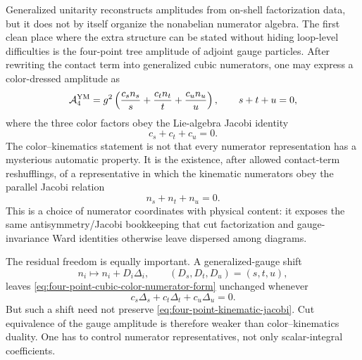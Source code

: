 \begin{construction}
\label{constr:four-point-color-kinematics-comparison}
Generalized unitarity reconstructs amplitudes from on-shell factorization
data, but it does not by itself organize the nonabelian numerator algebra.
The first clean place where the extra structure can be stated without hiding
loop-level difficulties is the four-point tree amplitude of adjoint gauge
particles.  After rewriting the contact term into generalized cubic
numerators, one may express a color-dressed amplitude as
\begin{equation}
  \mathcal A_4^{\rm YM}
  =
  g^2\left(
    \frac{c_s n_s}{s}
    +\frac{c_t n_t}{t}
    +\frac{c_u n_u}{u}
  \right),
  \qquad s+t+u=0,
  \label{eq:four-point-cubic-color-numerator-form}
\end{equation}
where the three color factors obey the Lie-algebra Jacobi identity
\begin{equation}
  c_s+c_t+c_u=0 .
  \label{eq:four-point-color-jacobi}
\end{equation}
The color--kinematics statement is not that every numerator representation
has a mysterious automatic property.  It is the existence, after allowed
contact-term reshufflings, of a representative in which the kinematic
numerators obey the parallel Jacobi relation
\begin{equation}
  n_s+n_t+n_u=0 .
  \label{eq:four-point-kinematic-jacobi}
\end{equation}
This is a choice of numerator coordinates with physical content: it exposes
the same antisymmetry/Jacobi bookkeeping that cut factorization and
gauge-invariance Ward identities otherwise leave dispersed among diagrams.

The residual freedom is equally important.  A generalized-gauge shift
\begin{equation}
  n_i\longmapsto n_i+D_i\Delta_i,\qquad
  (D_s,D_t,D_u)=(s,t,u),
  \label{eq:four-point-generalized-gauge-shift}
\end{equation}
leaves \eqref{eq:four-point-cubic-color-numerator-form} unchanged whenever
\begin{equation}
  c_s\Delta_s+c_t\Delta_t+c_u\Delta_u=0 .
  \label{eq:four-point-generalized-gauge-null}
\end{equation}
But such a shift need not preserve
\eqref{eq:four-point-kinematic-jacobi}.  Cut equivalence of the gauge
amplitude is therefore weaker than color--kinematics duality.  One has to
control numerator representatives, not only scalar-integral coefficients.


\end{construction}
